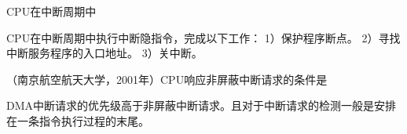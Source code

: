 \question CPU在中断周期中
\par{}
\begin{solution}CPU在中断周期中执行中断隐指令，完成以下工作： 1）保护程序断点。
2）寻找中断服务程序的入口地址。 3）关中断。
\end{solution}
\question （南京航空航天大学，2001年）CPU响应非屏蔽中断请求的条件是
\par{}
\begin{solution}DMA中断请求的优先级高于非屏蔽中断请求。且对于中断请求的检测一般是安排在一条指令执行过程的末尾。
\end{solution}
